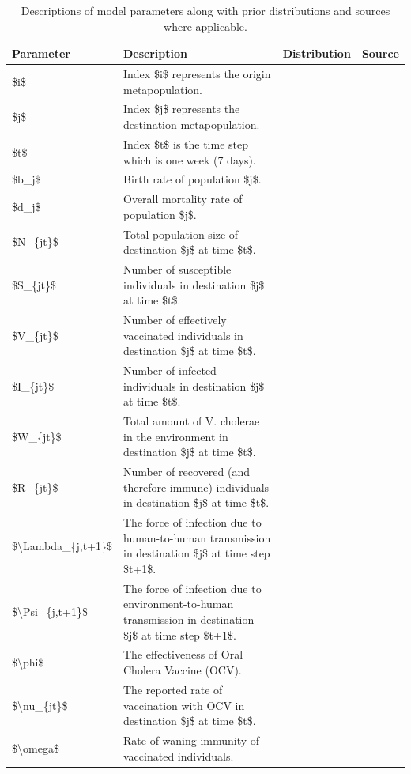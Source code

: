 \documentclass[
]{book}
\begin{document}
\begin{table}

\caption{\label{tab:params}Descriptions of model parameters along with prior distributions and sources where applicable.}
\centering
\begin{tabular}[t]{l|l|l|l}
\hline
Parameter & Description & Distribution & Source\\
\hline
\$i\$ & Index \$i\$ represents the origin metapopulation. &  & \\
\hline
\$j\$ & Index \$j\$ represents the destination metapopulation. &  & \\
\hline
\$t\$ & Index \$t\$ is the time step which is one week (7 days). &  & \\
\hline
\$b\_j\$ & Birth rate of population \$j\$. &  & \\
\hline
\$d\_j\$ & Overall mortality rate of population \$j\$. &  & \\
\hline
\$N\_\{jt\}\$ & Total population size of destination \$j\$ at time \$t\$. &  & \\
\hline
\$S\_\{jt\}\$ & Number of susceptible individuals in destination \$j\$ at time \$t\$. &  & \\
\hline
\$V\_\{jt\}\$ & Number of effectively vaccinated individuals in destination \$j\$ at time \$t\$. &  & \\
\hline
\$I\_\{jt\}\$ & Number of infected individuals in destination \$j\$ at time \$t\$. &  & \\
\hline
\$W\_\{jt\}\$ & Total amount of V. cholerae in the environment in destination \$j\$ at time \$t\$. &  & \\
\hline
\$R\_\{jt\}\$ & Number of recovered (and therefore immune) individuals in destination \$j\$ at time \$t\$. &  & \\
\hline
\$\textbackslash{}Lambda\_\{j,t+1\}\$ & The force of infection due to human-to-human transmission in destination \$j\$ at time step \$t+1\$. &  & \\
\hline
\$\textbackslash{}Psi\_\{j,t+1\}\$ & The force of infection due to environment-to-human transmission in destination \$j\$ at time step \$t+1\$. &  & \\
\hline
\$\textbackslash{}phi\$ & The effectiveness of Oral Cholera Vaccine (OCV). &  & \\
\hline
\$\textbackslash{}nu\_\{jt\}\$ & The reported rate of vaccination with OCV in destination \$j\$ at time \$t\$. &  & \\
\hline
\$\textbackslash{}omega\$ & Rate of waning immunity of vaccinated individuals. &  & \\

\end{tabular}
\end{table}
\end{document}
